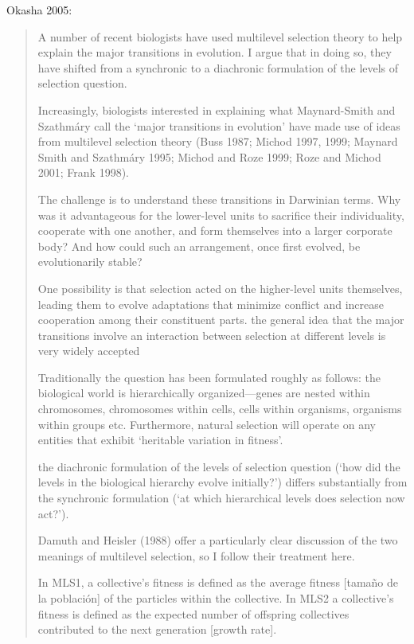 \documentclass[a4paper,10pt]{article}
\begin{document}
Okasha 2005:
\begin{quotation} \cite{okasha2005-multilevelTransitions}   
    A number of recent biologists have used multilevel selection theory to help explain the major transitions in evolution.
    I argue that in doing so, they have shifted from a synchronic to a diachronic formulation of the levels of selection question.
    
    Increasingly, biologists interested in explaining what Maynard-Smith and Szathmáry call the ‘major transitions in evolution’ have made use of ideas from multilevel selection theory (Buss 1987; Michod 1997, 1999; Maynard Smith and Szathmáry 1995; Michod and Roze 1999; Roze and Michod 2001; Frank 1998).
    
    The challenge is to understand these transitions in Darwinian terms.
    Why was it advantageous for the lower-level units to sacrifice their individuality, cooperate with one another, and form themselves into a larger corporate body?
    And how could such an arrangement, once first evolved, be evolutionarily stable?
    
    One possibility is that selection acted on the higher-level units themselves, leading them to evolve adaptations that minimize conflict and increase cooperation among their constituent parts.
    the general idea that the major transitions involve an interaction between selection at different levels is very widely accepted
    
    Traditionally the question has been formulated roughly as follows: the biological world is hierarchically organized—genes are nested within chromosomes, chromosomes within cells, cells within organisms, organisms within groups etc. Furthermore, natural selection will operate on any entities that exhibit ‘heritable variation in fitness’.
    
    the diachronic formulation of the levels of selection question (‘how did the levels in the biological hierarchy evolve initially?’) differs substantially from the synchronic formulation (‘at which hierarchical levels does selection now act?’).

    Damuth and Heisler (1988) offer a particularly clear discussion of the two meanings of multilevel selection, so I follow their treatment here.
    
    In MLS1, a collective’s fitness is defined as the average fitness [tamaño de la población] of the particles within the collective.
    In MLS2 a collective’s fitness is defined as the expected number of offspring collectives contributed to the next generation [growth rate].
    

\end{quotation}
\end{document}

